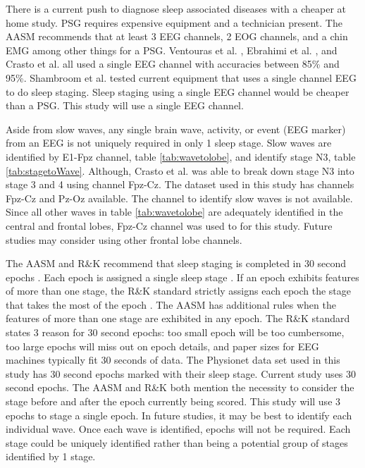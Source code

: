 \documentclass[12pt, oneside]{book}
\begin{document}
There is a current push to diagnose sleep associated diseases with a cheaper at home study. PSG requires expensive equipment and a technician present. The AASM \cite{berry_md_chair_aasm_nodate} recommends that at least 3 EEG channels, 2 EOG channels, and a chin EMG among other things for a PSG. Ventouras et al. \cite{ventouras_sleep_2005}, Ebrahimi et al. \cite{ebrahimi_automatic_2008}, and Crasto et al. \cite{crasto_wavelet_2017} all used a single EEG channel with accuracies between 85\% and 95\%. Shambroom et al. \cite{shambroom_validation_2012} tested current equipment that uses a single channel EEG to do sleep staging. Sleep staging using a single EEG channel would be cheaper than a PSG. This study will use a single EEG channel.

Aside from slow waves, any single brain wave, activity, or event (EEG marker) from an EEG is not uniquely required in only 1 sleep stage. Slow waves are identified by E1-Fpz channel, table \ref{tab:wavetolobe}, and identify stage N3, table \ref{tab:stagetoWave}. Although, Crasto et al. \cite{crasto_wavelet_2017} was able to break down stage N3 into stage 3 and 4 using channel Fpz-Cz. The dataset used in this study has channels Fpz-Cz and Pz-Oz available. The channel to identify slow waves is not available. Since all other waves in table \ref{tab:wavetolobe} are adequately identified in the central and frontal lobes, Fpz-Cz channel was used to for this study. Future studies may consider using other frontal lobe channels.

The AASM  and R\&K recommend that sleep staging is completed in 30 second epochs \cite{berry_md_chair_aasm_nodate} \cite{rechtschaffen_manual_nodate}. Each epoch is assigned a single sleep stage \cite{rechtschaffen_manual_nodate} \cite{berry_md_chair_aasm_nodate}. If an epoch exhibits features of more than one stage, the R\&K standard \cite{rechtschaffen_manual_nodate} strictly assigns each epoch the stage that takes the most of the epoch . The AASM \cite{berry_md_chair_aasm_nodate} has additional rules when the features of more than one stage are exhibited in any epoch. The R\&K standard \cite{rechtschaffen_manual_nodate} states 3 reason for 30 second epochs: too small epoch will be too cumbersome, too large epochs will miss out on epoch details, and paper sizes for EEG machines typically fit 30 seconds of data. The Physionet data set \cite{noauthor_sleep-edf_nodate} used in this study has 30 second epochs marked with their sleep stage. Current study uses 30 second epochs. The AASM and R\&K both mention the necessity to consider the stage before and after the epoch currently being scored. This study will use 3 epochs to stage a single epoch. In future studies, it may be best to identify each individual wave. Once each wave is identified, epochs will not be required. Each stage could be uniquely identified rather than being a potential group of stages identified by 1 stage.
\end{document}

